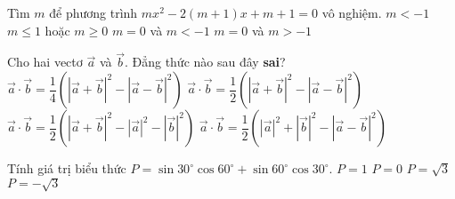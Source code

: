 \begin{ex}%
	Tìm $m$ để phương trình $mx^2-2\left(m+1\right)x+m+1=0$ vô nghiệm.
	\choice
	{\True $m<-1$}
	{$m\le 1$ hoặc $m\ge 0$}
	{$m=0$ và $m<-1$}
	{$m=0$ và $m>-1$}
\end{ex}
\begin{ex}%
	Cho hai vectơ $\vec{a}$ và $\overrightarrow{b}$. Đẳng thức nào sau đây \textbf{sai}?
	\choice
	{$\vec{a}\cdot \overrightarrow{b}=\dfrac{1}{4}\left({\left| \vec{a}+\overrightarrow{b}\right|}^2-{\left| \vec{a}-\overrightarrow{b}\right|}^2\right)$}
	{\True $\vec{a}\cdot\overrightarrow{b}=\dfrac{1}{2}\left({\left| \vec{a}+\overrightarrow{b}\right|}^2-{\left| \vec{a}-\overrightarrow{b}\right|}^2\right)$}
	{$\vec{a}\cdot\overrightarrow{b}=\dfrac{1}{2}\left({\left| \vec{a}+\overrightarrow{b}\right|}^2-{\left| {\vec{a}}\right|}^2-{\left| \overrightarrow{b}\right|}^2\right)$}
	{$\vec{a}\cdot\overrightarrow{b}=\dfrac{1}{2}\left({\left| {\vec{a}}\right|}^2+{\left| \overrightarrow{b}\right|}^2-{\left| \vec{a}-\overrightarrow{b}\right|}^2\right)$}
\end{ex}
\begin{ex}%
	Tính giá trị biểu thức $P=\sin 30^\circ\cos 60^\circ+\sin 60^\circ\cos 30^\circ.$
	\choice
	{\True $P=1$}
	{$P=0$}
	{$P=\sqrt{3}$}
	{$P=-\sqrt{3}$}
\end{ex}
